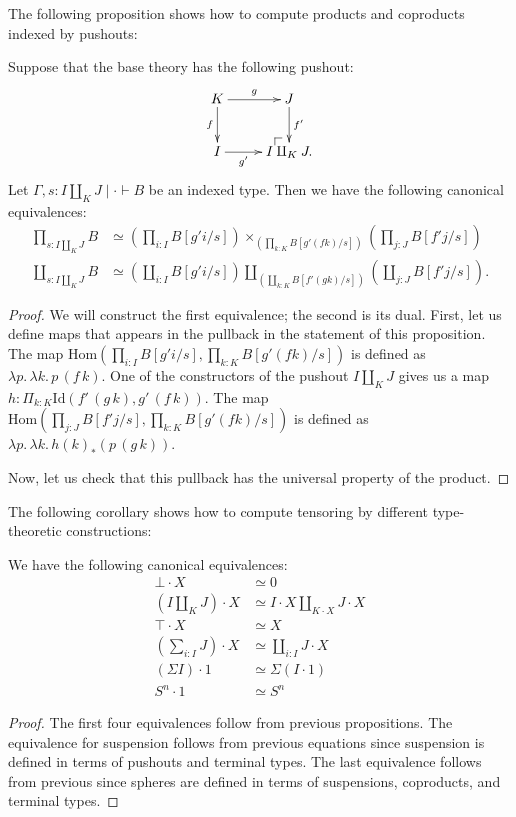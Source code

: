 \documentclass[reqno]{amsart}
\makeatletter
\theoremstyle{definition}
\theoremstyle{remark}
\newcommand{\ob}{}
\newcommand{\fs}[1]{\mathrm{#1}}
\newcommand{\Hom}{\fs{Hom}}
\newcommand{\Id}{\fs{Id}}
\numberwithin{figure}{section}
\newcommand{\po}[1][dr]{\save*!/#1+1.2pc/#1:(1,-1)@^{|-}\restore}
\makeatother
\begin{document}
The following proposition shows how to compute products and coproducts indexed by pushouts:

\begin{prop}
Suppose that the base theory has the following pushout:
\[ \xymatrix{ K \ar[r]^-g \ar[d]_-f & J \ar[d]^-{f'} \\
              I \ar[r]_-{g'}        & \po I \amalg_K J.
            } \]
Let $\Gamma, s : I \amalg_K J \mid \cdot \vdash B \ob$ be an indexed type.
Then we have the following canonical equivalences:
\begin{align*}
\prod_{s : I \amalg_K J} B & \simeq (\prod_{i : I} B[g' i/s]) \times_{(\prod_{k : K} B[g' (f k) / s])} (\prod_{j : J} B[f' j/s]) \\
\coprod_{s : I \amalg_K J} B & \simeq (\coprod_{i : I} B[g' i/s]) \amalg_{(\coprod_{k : K} B[f' (g k) / s])} (\coprod_{j : J} B[f' j/s]).
\end{align*}
\end{prop}
\begin{proof}
We will construct the first equivalence; the second is its dual.
First, let us define maps that appears in the pullback in the statement of this proposition.
The map $\Hom(\prod_{i : I} B[g' i/s], \prod_{k : K} B[g' (f k) / s])$ is defined as $\lambda p.\,\lambda k.\,p\,(f\,k)$.
One of the constructors of the pushout $I \amalg_K J$ gives us a map $h : \Pi_{k : K} \Id(f'\,(g\,k),g'\,(f\,k))$.
The map $\Hom(\prod_{j : J} B[f' j/s], \prod_{k : K} B[g' (f k) / s])$ is defined as $\lambda p.\,\lambda k.\,h(k)_*(p\,(g\,k))$.

Now, let us check that this pullback has the universal property of the product.
\end{proof}

The following corollary shows how to compute tensoring by different type-theoretic constructions:

\begin{cor}
We have the following canonical equivalences:
\begin{align*}
\bot \cdot X & \simeq 0 \\
(I \amalg_K J) \cdot X & \simeq I \cdot X \amalg_{K \cdot X} J \cdot X \\
\top \cdot X & \simeq X \\
(\sum_{i : I} J) \cdot X & \simeq \coprod_{i : I} J \cdot X \\
(\Sigma I) \cdot 1 & \simeq \Sigma (I \cdot 1) \\
S^n \cdot 1 & \simeq S^n
\end{align*}
\end{cor}
\begin{proof}
The first four equivalences follow from previous propositions.
The equivalence for suspension follows from previous equations since suspension is defined in terms of pushouts and terminal types.
The last equivalence follows from previous since spheres are defined in terms of suspensions, coproducts, and terminal types.
\end{proof}
\end{document}
